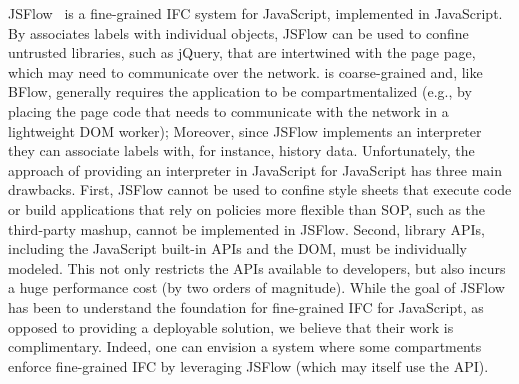 JSFlow~\cite{JSFlow} is a fine-grained IFC system for JavaScript,
implemented in JavaScript.
%
By associates labels with individual objects, JSFlow can be used to
confine untrusted libraries, such as jQuery, that are intertwined with
the page page, which may need to communicate over the network.
%
\sys{} is coarse-grained and, like BFlow, generally requires the
application to be compartmentalized (e.g., by placing the page code
that needs to communicate with the network in a lightweight DOM
worker); 
%
Moreover, since JSFlow implements an interpreter they can associate
labels with, for instance, history data.
%
Unfortunately, the approach of providing an interpreter in JavaScript
for JavaScript has three main drawbacks.
%
First, JSFlow cannot be used to confine style sheets that execute code
or build applications that rely on policies more flexible than SOP,
such as the third-party mashup, cannot be implemented in JSFlow.
%
%
Second, library APIs, including the JavaScript built-in APIs and the
DOM, must be individually modeled.
%
This not only restricts the APIs available to developers, but also
incurs a huge performance cost (by two orders of magnitude).
%
While the goal of JSFlow has been to understand the foundation for
fine-grained IFC for JavaScript, as opposed to providing a deployable
solution, we believe that their work is complimentary.
%
Indeed, one can envision a system where some \sys{} compartments
enforce fine-grained IFC by leveraging JSFlow (which may itself use
the \sys{} API).





